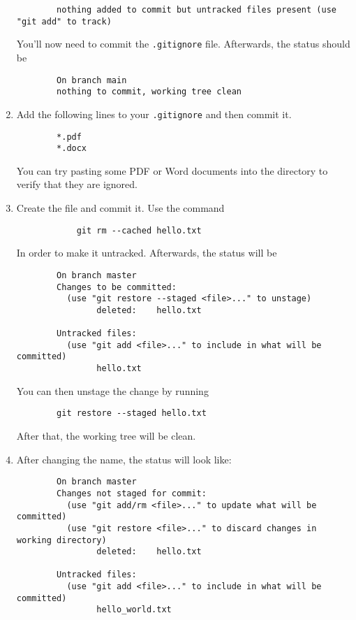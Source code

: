 \begin{enumerate}
\begin{verbatim}
        nothing added to commit but untracked files present (use "git add" to track)
        \end{verbatim}
        You'll now need to commit the \verb+.gitignore+ file.
        Afterwards, the status should be
        \begin{verbatim}
        On branch main
        nothing to commit, working tree clean
        \end{verbatim}
    \item Add the following lines to your \verb+.gitignore+ and then commit
        it.
        \begin{verbatim}
        *.pdf
        *.docx
        \end{verbatim}
        You can try pasting some PDF or Word documents into the directory to
        verify that they are ignored.
    \item Create the file and commit it. Use the command
        \begin{verbatim}
            git rm --cached hello.txt
        \end{verbatim}
        In order to make it untracked.
        Afterwards, the status will be
        \begin{verbatim}
        On branch master
        Changes to be committed:
          (use "git restore --staged <file>..." to unstage)
                deleted:    hello.txt

        Untracked files:
          (use "git add <file>..." to include in what will be committed)
                hello.txt
        \end{verbatim}
        You can then unstage the change by running
        \begin{verbatim}
        git restore --staged hello.txt
        \end{verbatim}
        After that, the working tree will be clean.
    \item After changing the name, the status will look like:
        \begin{verbatim}
        On branch master
        Changes not staged for commit:
          (use "git add/rm <file>..." to update what will be committed)
          (use "git restore <file>..." to discard changes in working directory)
                deleted:    hello.txt

        Untracked files:
          (use "git add <file>..." to include in what will be committed)
                hello_world.txt


\end{verbatim}
\end{enumerate}
